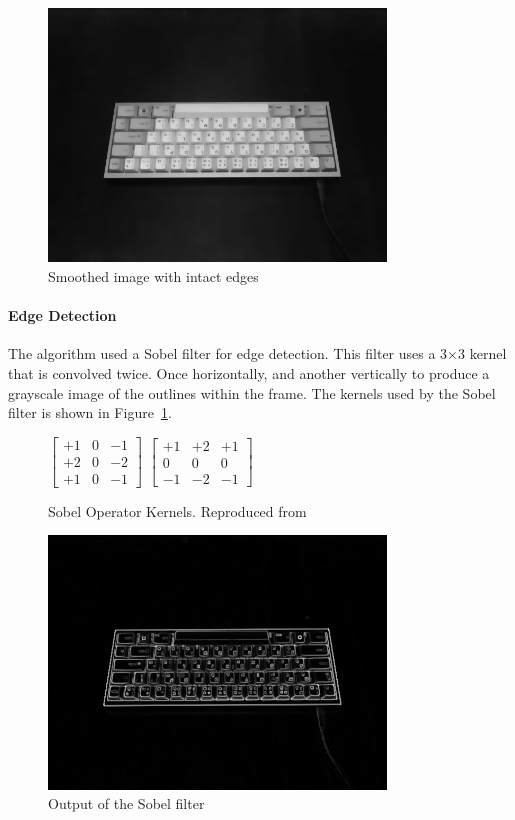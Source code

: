 \documentclass{report}
\begin{document}
\begin{figure}[H]
	\centering
	\includegraphics[width=0.8\textwidth]{denoised.png}
	\caption{Smoothed image with intact edges}
	\centering
\end{figure}


\paragraph{Edge Detection}
The algorithm used a Sobel filter for edge detection. This filter uses a
3$\times$3 kernel that is convolved twice. Once horizontally, and another
vertically to produce a grayscale image of the outlines within the frame. The
kernels used by the Sobel filter \parencite{sobel2014} is shown in
Figure~\ref{fig:metho-algo-key-sobel}.

\begin{figure}[H]
	\centering
	$\begin{bmatrix}
			+1 & 0 & -1 \\
			+2 & 0 & -2 \\
			+1 & 0 & -1
		\end{bmatrix}$
	$\begin{bmatrix}
			+1 & +2 & +1 \\
			0  & 0  & 0  \\
			-1 & -2 & -1
		\end{bmatrix}$
	\caption{Sobel Operator Kernels. Reproduced from }
	\label{fig:metho-algo-key-sobel}
\end{figure}

\begin{figure}[H]
	\centering
	\includegraphics[width=0.8\textwidth]{sobel.png}
	\caption{Output of the Sobel filter}
	\centering
\end{figure}
\end{document}
